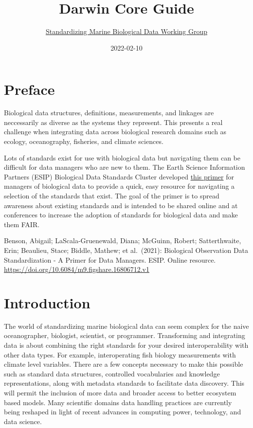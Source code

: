 \documentclass[
]{book}
\title{Darwin Core Guide}
\author{\href{https://github.com/ioos/bio_data_guide/graphs/contributors}{Standardizing Marine Biological Data Working Group}}
\date{2022-02-10}
\begin{document}
\maketitle

{
\setcounter{tocdepth}{1}
\tableofcontents
}
\hypertarget{preface}{%
\chapter*{Preface}\label{preface}}

Biological data structures, definitions, measurements, and linkages are neccessarily as diverse as the systems they represent. This presents a real challenge when integrating data across biological research domains such as ecology, oceanography, fisheries, and climate sciences.

Lots of standards exist for use with biological data but navigating them can be difficult for data managers who are new to them. The Earth Science Information Partners (ESIP) Biological Data Standards Cluster developed \href{https://doi.org/10.6084/m9.figshare.16806712.v1}{this primer} for managers of biological data to provide a quick, easy resource for navigating a selection of the standards that exist. The goal of the primer is to spread awareness about existing standards and is intended to be shared online and at conferences to increase the adoption of standards for biological data and make them FAIR.

Benson, Abigail; LaScala-Gruenewald, Diana; McGuinn, Robert; Satterthwaite, Erin; Beaulieu, Stace; Biddle, Mathew; et al.~(2021): Biological Observation Data Standardization - A Primer for Data Managers. ESIP. Online resource. \url{https://doi.org/10.6084/m9.figshare.16806712.v1}

\hypertarget{intro}{%
\chapter{Introduction}\label{intro}}

The world of standardizing marine biological data can seem complex for the naive oceanographer, biologist, scientist, or programmer.
Transforming and integrating data is about combining the right standards for your desired interoperability with other data types.
For example, interoperating fish biology measurements with climate level variables.
There are a few concepts necessary to make this possible such as standard data structures, controlled vocabularies and knowledge representations, along with metadata standards to facilitate data discovery. This will permit the inclusion of more data and broader access to better ecosystem based models. Many scientific domains data handling practices are currently being reshaped in light of recent advances in computing power, technology, and data science.
\end{document}
